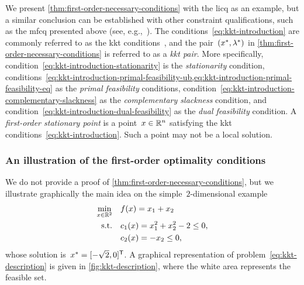 We present \cref{thm:first-order-necessary-conditions} with the \gls{licq} as an example, but a similar conclusion can be established with other constraint qualifications, such as the \gls{mfcq} presented above (see, e.g.,~\cite[p.~339]{Nocedal_Wright_2006}).
The conditions~\cref{eq:kkt-introduction} are commonly referred to as the \gls{kkt} conditions~\cite{Karush_1939,Kuhn_Tucker_1951}, and the pair~$(\iter[\ast], \lm[\ast])$ in \cref{thm:first-order-necessary-conditions} is referred to as a \emph{\gls{kkt} pair}.
More specifically, condition~\cref{eq:kkt-introduction-stationarity} is the \emph{stationarity} condition, conditions~\cref{eq:kkt-introduction-primal-feasibility-ub,eq:kkt-introduction-primal-feasibility-eq} as the \emph{primal feasibility} conditions, condition~\cref{eq:kkt-introduction-complementary-slackness} as the \emph{complementary slackness} condition, and condition~\cref{eq:kkt-introduction-dual-feasibility} as the \emph{dual feasibility} condition.
A \emph{first-order stationary point} is a point~$\iter \in \R^n$ satisfying the \gls{kkt} conditions~\cref{eq:kkt-introduction}.
Such a point may not be a local solution.

\subsubsection{An illustration of the first-order optimality conditions}

We do not provide a proof of \cref{thm:first-order-necessary-conditions}, but we illustrate graphically the main idea on the simple~$2$-dimensional example
\begin{subequations}
    \label{eq:kkt-description}
    \begin{align}
        \min_{\iter \in \R^2}   & \quad \obj(\iter) = x_1 + x_2\\
        \text{s.t.}             & \quad \con{1}(\iter) = x_1^2 + x_2^2 - 2 \le 0, \label{eq:kkt-description-c1}\\
                                & \quad \con{2}(\iter) = -x_2 \le 0, \label{eq:kkt-description-c2}
    \end{align}
\end{subequations}
whose solution is~$\iter[\ast] = [-\sqrt{2}, 0]^{\T}$.
A graphical representation of problem~\cref{eq:kkt-description} is given in \cref{fig:kkt-description}, where the white area represents the feasible set.


